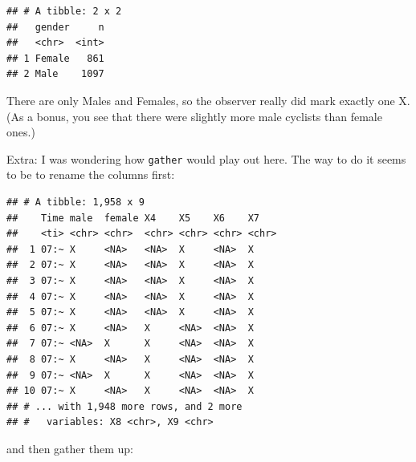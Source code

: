 \documentclass[]{tufte-book}
\newenvironment{Shaded}{}{}
\newcommand{\DataTypeTok}[1]{\textcolor[rgb]{0.56,0.13,0.00}{#1}}
\newcommand{\KeywordTok}[1]{\textcolor[rgb]{0.00,0.44,0.13}{\textbf{#1}}}
\newcommand{\NormalTok}[1]{#1}
\newcommand{\OperatorTok}[1]{\textcolor[rgb]{0.40,0.40,0.40}{#1}}
\newcommand{\StringTok}[1]{\textcolor[rgb]{0.25,0.44,0.63}{#1}}
\theoremstyle{definition}
\theoremstyle{definition}
\theoremstyle{definition}
\theoremstyle{remark}
\begin{document}
\begin{verbatim}
## # A tibble: 2 x 2
##   gender     n
##   <chr>  <int>
## 1 Female   861
## 2 Male    1097
\end{verbatim}

There are only Males and Females, so the observer really did mark
exactly one X. (As a bonus, you see that there were slightly more male
cyclists than female ones.)

Extra: I was wondering how \texttt{gather} would play out here. The way
to do it seems to be to rename the columns first:

\begin{Shaded}
\end{Shaded}

\begin{verbatim}
## # A tibble: 1,958 x 9
##    Time male  female X4    X5    X6    X7   
##    <ti> <chr> <chr>  <chr> <chr> <chr> <chr>
##  1 07:~ X     <NA>   <NA>  X     <NA>  X    
##  2 07:~ X     <NA>   <NA>  X     <NA>  X    
##  3 07:~ X     <NA>   <NA>  X     <NA>  X    
##  4 07:~ X     <NA>   <NA>  X     <NA>  X    
##  5 07:~ X     <NA>   <NA>  X     <NA>  X    
##  6 07:~ X     <NA>   X     <NA>  <NA>  X    
##  7 07:~ <NA>  X      X     <NA>  <NA>  X    
##  8 07:~ X     <NA>   X     <NA>  <NA>  X    
##  9 07:~ <NA>  X      X     <NA>  <NA>  X    
## 10 07:~ X     <NA>   X     <NA>  <NA>  X    
## # ... with 1,948 more rows, and 2 more
## #   variables: X8 <chr>, X9 <chr>
\end{verbatim}

and then gather them up:

\begin{Shaded}
\end{Shaded}
\end{document}
